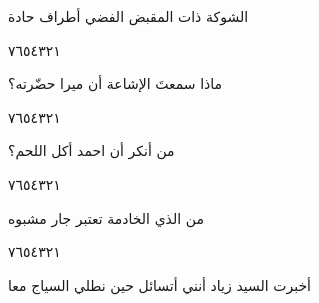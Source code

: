 \documentclass[11pt, a4paper]{article}
\begin{document}
{\vfill\clearpage

\vspace{0.5\baselineskip}\begin{flushright}
\textarabic{الشوكة ذات المقبض الفضي أطراف حادة}
\end{flushright}

\begin{center}
        \hfill\textarabic{٧}\hfill\textarabic{٦}\hfill\textarabic{٥}\hfill\textarabic{٤}\hfill\textarabic{٣}\hfill\textarabic{٢}\hfill\textarabic{١}
        \end{center}


\vspace{0.5\baselineskip}\begin{flushright}
\textarabic{ماذا سمعتَ الإشاعة أن ميرا حضّرته؟}
\end{flushright}

\begin{center}
        \hfill\textarabic{٧}\hfill\textarabic{٦}\hfill\textarabic{٥}\hfill\textarabic{٤}\hfill\textarabic{٣}\hfill\textarabic{٢}\hfill\textarabic{١}
        \end{center}


\vspace{0.5\baselineskip}\begin{flushright}
\textarabic{من أنكر أن احمد أكل اللحم؟}
\end{flushright}

\begin{center}
        \hfill\textarabic{٧}\hfill\textarabic{٦}\hfill\textarabic{٥}\hfill\textarabic{٤}\hfill\textarabic{٣}\hfill\textarabic{٢}\hfill\textarabic{١}
        \end{center}


\vspace{0.5\baselineskip}\begin{flushright}
\textarabic{من الذي الخادمة تعتبر جار مشبوه}
\end{flushright}

\begin{center}
        \hfill\textarabic{٧}\hfill\textarabic{٦}\hfill\textarabic{٥}\hfill\textarabic{٤}\hfill\textarabic{٣}\hfill\textarabic{٢}\hfill\textarabic{١}
        \end{center}


\vspace{0.5\baselineskip}\begin{flushright}
\textarabic{أخبرت السيد زياد أنني أتسائل حين نطلي السياج معا}
\end{flushright}

}
\end{document}
